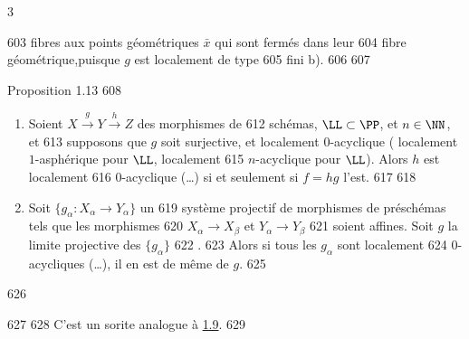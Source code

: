 3	\documentclass[10pt]{../fichiers-configuration-latex/smfart}
\begin{document}
   603	fibres aux points géométriques $\bar{x}$ qui sont fermés dans leur
   604	fibre géométrique,\pageoriginale puisque $g$ est localement de type
   605	fini  b).
   606	
   607	\begin{enonce*}{Proposition 1.13}
   608	\begin{enumerate}
   609	\renewcommand{\theenumi}{\roman{enumi}}
   610	\renewcommand{\labelenumi}{(\theenumi)}
   611	\item Soient $X\xrightarrow{g}Y\xrightarrow{h}Z$ des morphismes de
   612	schémas, $\LL\subset \PP$, et $n\in \NN$, et
   613	supposons que $g$ soit surjective, et localement $0$-acyclique (	localement $1$-asphérique pour $\LL$, \resp localement
   615	$n$-acyclique pour $\LL$). Alors $h$ est localement
   616	$0$-acyclique (\resp\ldots) si et seulement si $f=hg$ l'est.
   617	
   618	\item Soit $\{g_{\alpha}:X_{\alpha}\rightarrow Y_{\alpha}\}$ un
   619	système projectif de morphismes de préschémas tels que les morphismes
   620	$X_{\alpha}\rightarrow X_{\beta}$ et $Y_{\alpha}\rightarrow Y_{\beta}$
   621	soient affines. Soit $g$ la limite projective des $\{g_{\alpha}\}$
   622	.
   623	Alors si tous les $g_{\alpha}$ sont localement
   624	$0$-acycliques (\resp\ldots), il en est de même de $g$.
   625	\end{enumerate}
   626	\end{enonce*}
   627	
   628	C'est un sorite analogue à \hyperref[XV.prop1.9]{1.9}.
   629	
\end{document}
